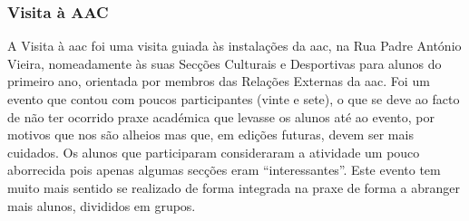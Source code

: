 
\subsubsection{Visita à AAC}

A Visita à \acrshort{aac} foi uma visita guiada às instalações da \acrshort{aac}, na Rua Padre António Vieira, nomeadamente às suas Secções Culturais e Desportivas para alunos do primeiro ano, orientada por membros das Relações Externas da \acrshort{aac}. Foi um evento que contou com poucos participantes (vinte e sete), o que se deve ao facto de não ter ocorrido praxe académica que levasse os alunos até ao evento, por motivos que nos são alheios mas que, em edições futuras, devem ser mais cuidados. Os alunos que participaram consideraram a atividade um pouco aborrecida pois apenas algumas secções eram “interessantes”.
Este evento tem muito mais sentido se realizado de forma integrada na praxe de forma a abranger mais alunos, divididos em grupos.
